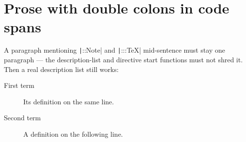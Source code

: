 \section{Prose with double colons in code spans}

A paragraph mentioning \texttt|::Note| and \texttt|:::TeX| mid-sentence must stay one
paragraph — the description-list and directive start functions must not
shred it. Then a real description list still works:

\begin{description}
\item[First term] Its definition on the same line.
\item[Second term] A definition on the following line.
\end{description}

